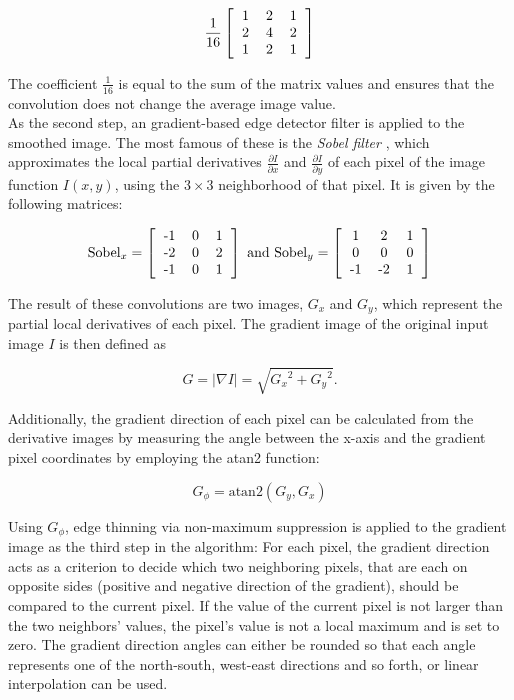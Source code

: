 \[ \frac{1}{16} \left [ \begin{tabular}{ccc}
				1& 2& 1\\
				2& 4& 2\\
				1& 2& 1 
			   \end{tabular} \right ]\]

\noindent The coefficient $\frac{1}{16}$ is equal to the sum of the matrix values and ensures that the convolution does not change the average image value. \cite[p. 41]{machine_vision}\\

\noindent As the second step, an gradient-based edge detector filter is applied to the smoothed image. The most famous of these is the \textit{Sobel filter} \cite{sobel}, which approximates the local partial derivatives $\frac{\partial I}{\partial x}$ and $\frac{\partial I}{\partial y}$ of each pixel of the image function $I(x, y)$, using the $3 \times 3$ neighborhood of that pixel. It is given by the following matrices\cite[pp. 113 -- 114]{machine_vision}:

\[ \text{Sobel}_x = \left [ \begin{tabular}{ccc}
				-1& 0& 1\\
				-2& 0& 2\\
				-1& 0& 1 
			   \end{tabular} \right ] \text{ and } 
\text{Sobel}_y = \left [ \begin{tabular}{ccc}
				1& 2& 1\\
				0& 0& 0\\
				-1& -2& 1 
			   \end{tabular} \right ] 
\]

\noindent The result of these convolutions are two images, $G_x$ and $G_y$, which represent the partial local derivatives of each pixel. The gradient image of the original input image $I$ is then defined as

\[G = |\nabla I| = \sqrt{{G_x}^2 + {G_y}^2}.\]

\noindent Additionally, the gradient direction of each pixel can be calculated from the derivative images by measuring the angle between the x-axis and the gradient pixel coordinates by employing the atan2 function:

\[G_\phi = \text{atan2}(G_y, G_x) \]

\noindent Using $G_\phi$, edge thinning via non-maximum suppression is applied to the gradient image as the third step in the algorithm: For each pixel, the gradient direction acts as a criterion to decide which two neighboring pixels, that are each on opposite sides (positive and negative direction of the gradient), should be compared to the current pixel. If the value of the current pixel is not larger than the two neighbors' values, the pixel's value is not a local maximum and is set to zero. The gradient direction angles can either be rounded so that each angle represents one of the north-south, west-east directions and so forth, or linear interpolation can be used.

